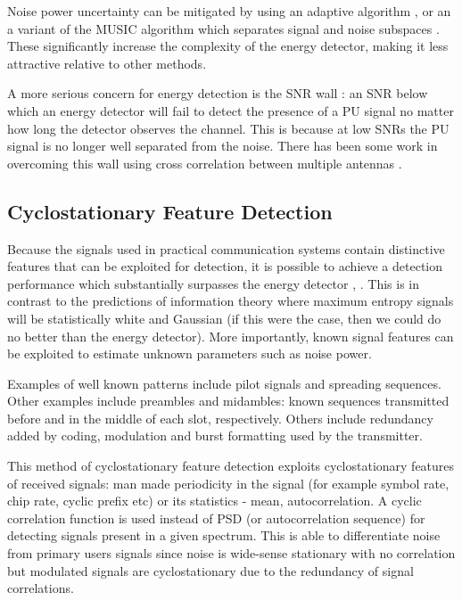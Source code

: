 Noise power uncertainty can be mitigated by using an adaptive algorithm \cite{zhang2011adaptive}, or an a variant of the MUSIC algorithm which separates signal and noise subspaces \cite{olivieri2005scalable}. These significantly increase the complexity of the energy detector, making it less attractive relative to other methods.

A more serious concern for energy detection is the SNR wall \cite{tandra2008snr}: an SNR below which an energy detector will fail to detect the presence of a PU signal no matter how long the detector observes the channel. This is because at low SNRs the PU signal is no longer well separated from the noise. There has been some work in overcoming this wall using cross correlation between multiple antennas \cite{oude2011lowering}.


\subsection{Cyclostationary Feature Detection}
Because the signals used in practical communication systems contain distinctive features that can be exploited for detection, it is possible to achieve a detection performance which substantially surpasses the energy detector \cite{ye2007spectrum}, \cite{kim2007cyclostationary}. This is in contrast to the predictions of information theory where maximum entropy signals will be statistically white and Gaussian (if this were the case, then we could do no better than the energy detector). More importantly, known signal features can be exploited to estimate unknown parameters such as noise power. 

Examples of well known patterns include pilot signals and spreading sequences. Other examples include preambles and midambles: known sequences transmitted before and in the middle of each slot, respectively. Others include redundancy added by coding, modulation and burst formatting used by the transmitter. 

This method of cyclostationary feature detection exploits cyclostationary features of received signals: man made periodicity in the signal (for example symbol rate, chip rate, cyclic prefix etc) or its statistics - mean, autocorrelation. A cyclic correlation function is used instead of PSD (or autocorrelation sequence) for detecting signals present in a given spectrum. This is able to differentiate noise from primary users signals since noise is wide-sense stationary with no correlation but modulated signals are cyclostationary due to the redundancy of signal correlations. 

